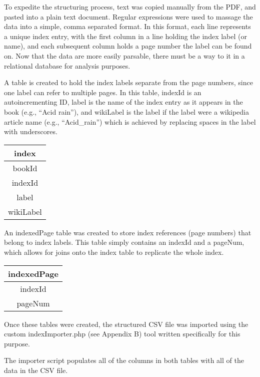 To expedite the structuring process, text was copied manually from the PDF, and pasted into a plain text document.
Regular expressions were used to massage the data into a simple, comma separated format.
In this format, each line represents a unique index entry, with the first column in a line holding the index label (or name), and each subsequent column holds a page number the label can be found on.
Now that the data are more easily parsable, there must be a way to it in a relational database for analysis purposes.

A table is created to hold the index labels separate from the page numbers, since one label can refer to multiple pages.
In this table, indexId is an autoincrementing ID, label is the name of the index entry as it appears in the book (e.g., ``Acid rain''), and wikiLabel is the label if the label were a wikipedia article name (e.g., ``Acid\_rain'') which is achieved by replacing spaces in the label with underscores.

\begin{center}
\begin{tabular}{|c|}
\hline 
\textbf{index} \\ 
\hline 
bookId \\ 
\hline 
indexId \\ 
\hline 
label \\ 
\hline 
wikiLabel \\ 
\hline 
\end{tabular}
\end{center}
 
An indexedPage table was created to store index references (page numbers) that belong to index labels.
This table simply contains an indexId and a pageNum, which allows for joins onto the index table to replicate the whole index.

\begin{center}
\begin{tabular}{|c|}
\hline 
\textbf{indexedPage} \\ 
\hline 
indexId \\ 
\hline 
pageNum \\ 
\hline 
\end{tabular} 
\end{center}

Once these tables were created, the structured CSV file was imported using the custom indexImporter.php (see Appendix B) tool written specifically for this purpose.

The importer script populates all of the columns in both tables with all of the data in the CSV file.


